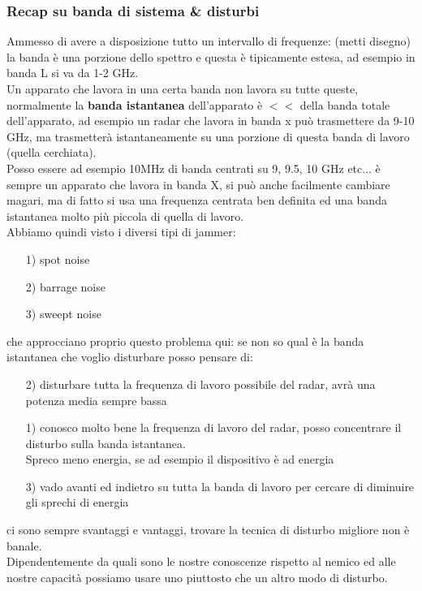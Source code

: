 \documentclass[oneside, 12pt]{extbook}
\begin{document}
\subsubsection{Recap su banda di sistema \& disturbi}
Ammesso di avere a disposizione tutto un intervallo di frequenze: (metti disegno)\\
la banda è una porzione dello spettro e questa è tipicamente estesa, ad esempio in banda L si va da 1-2 GHz.\\
Un apparato che lavora in una certa banda non lavora su tutte queste, normalmente la \textbf{banda istantanea} dell'apparato è $<<$ della banda totale dell'apparato, ad esempio un radar che lavora in banda x può trasmettere da 9-10 GHz, ma trasmetterà istantaneamente su una porzione di questa banda di lavoro (quella cerchiata).\\
Posso essere ad esempio 10MHz di banda centrati su 9, 9.5, 10 GHz etc... è sempre un apparato che lavora in banda X, si può anche facilmente cambiare magari, ma di fatto si usa una frequenza centrata ben definita ed una banda istantanea molto più piccola di quella di lavoro.\\
Abbiamo quindi visto i diversi tipi di jammer:
\begin{itemize}
	\item[1)] spot noise
	\item[2)] barrage noise
	\item[3)] sweept noise
\end{itemize}
che approcciano proprio questo problema qui: se non so qual è la banda istantanea che voglio disturbare posso pensare di:
\begin{itemize}
	\item[2)] disturbare tutta la frequenza di lavoro possibile del radar, avrà una potenza media sempre bassa
	\item[1)] conosco molto bene la frequenza di lavoro del radar, posso concentrare il disturbo sulla banda istantanea.\\
	Spreco meno energia, se ad esempio il dispositivo è ad energia
	\item[3)] vado avanti ed indietro su tutta la banda di lavoro per cercare di diminuire gli sprechi di energia
\end{itemize}
ci sono sempre svantaggi e vantaggi, trovare la tecnica di disturbo migliore non è banale.\\
Dipendentemente da quali sono le nostre conoscenze rispetto al nemico ed alle nostre capacità possiamo usare uno piuttosto che un altro modo di disturbo.\\
\end{document}
